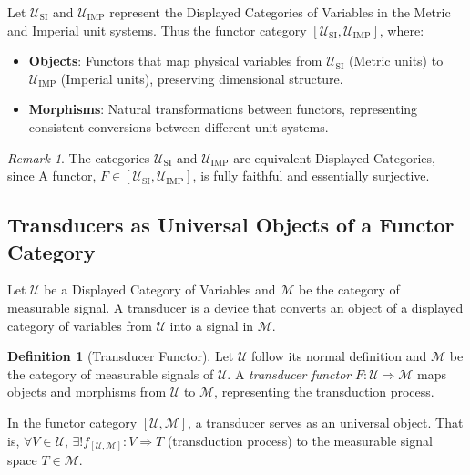 \documentclass{article}
\theoremstyle{definition}
\newtheorem{definition}{Definition}[section]
\theoremstyle{remark}
\newtheorem*{remark}{Remark}
\begin{document}
	Let $\mathcal{U}_{\text{SI}}$ and $\mathcal{U}_{\text{IMP}}$ represent the Displayed Categories of Variables in the Metric and Imperial unit systems.  Thus the functor category $[\mathcal{U}_{\text{SI}}, \mathcal{U}_{\text{IMP}}]$, where:
	\begin{itemize}
		\item \textbf{Objects}: Functors that map physical variables from $\mathcal{U}_{\text{SI}}$ (Metric units) to $\mathcal{U}_{\text{IMP}}$ (Imperial units), preserving dimensional structure.
		\item \textbf{Morphisms}: Natural transformations between functors, representing consistent conversions between different unit systems.
	\end{itemize}
	
	\begin{remark}
		The categories \( \mathcal{U}_{\text{SI}} \) and \( \mathcal{U}_{\text{IMP}} \) are equivalent Displayed Categories, since A functor, \( F \in [\mathcal{U}_{\text{SI}}, \mathcal{U}_{\text{IMP}}] \), is fully faithful and essentially surjective. 
	\end{remark}
	
	\subsection{Transducers as Universal Objects of a Functor Category}
	
	Let $\mathcal{U}$ be a Displayed Category of Variables and $\mathcal{M}$ be the category of measurable signal. A transducer is a device that converts an object of a displayed category of variables from $\mathcal{U}$ into a signal in $\mathcal{M}$.
	
	
	
	\begin{definition}[Transducer Functor]
		Let $\mathcal{U}$  follow its normal definition and $\mathcal{M}$ be the category of measurable signals of $\mathcal{U}$. A \emph{transducer functor} $F: \mathcal{U} \Rightarrow \mathcal{M}$ maps objects and morphisms from $\mathcal{U}$ to $\mathcal{M}$, representing the transduction process.
	\end{definition}
	
	In the functor category $[\mathcal{U}, \mathcal{M}]$, a transducer serves as an universal object. That is, $ \forall V \in \mathcal{U}$, $\exists! f_{[\mathcal{U}, \mathcal{M}]}: V  \Rightarrow T$ (transduction process) to the measurable signal space $T \in \mathcal{M}$.
	
\end{document}

